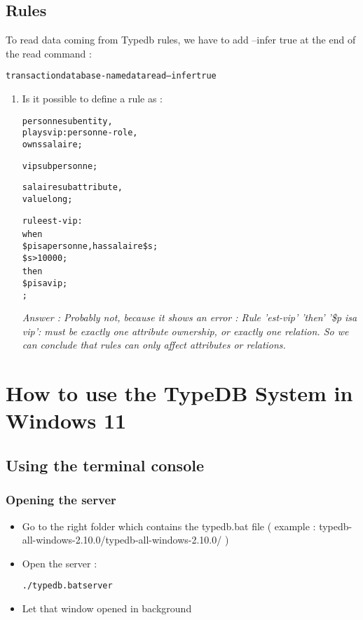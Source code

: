 \documentclass[runningheads]{llncs}
\begin{document}
\subsection{Rules}

To read data coming from Typedb rules, we have to add --infer true at the end of the read command : 
\begin{alltt}
transaction database-name data read --infer true
\end{alltt}


\begin{enumerate}
\item Is it possible to define a rule as :
\begin{alltt}
personne sub entity,
    plays vip:personne-role,
    owns salaire;
    
vip sub personne;

salaire sub attribute,
  value long;

rule est-vip:
when {
  \$p isa personne, has salaire \$s;
  \$s > 10000;
} then {
 \$p isa vip;
};
\end{alltt}

\emph{Answer : Probably not, because it shows an error : Rule 'est-vip' 'then' '\$p isa vip': must be exactly one attribute ownership, or exactly one relation.
So we can conclude that rules can only affect attributes or relations. }


\end{enumerate}


\section{How to use the TypeDB System in Windows 11}

\subsection{Using the terminal console}


\subsubsection{Opening the server}

\begin{itemize}
\item Go to the right folder which contains the typedb.bat file ( example : typedb-all-windows-2.10.0/typedb-all-windows-2.10.0/ )
\item Open the server : \begin{alltt}./typedb.bat server \end{alltt}
\item Let that window opened in background
\end{itemize}
\end{document}
